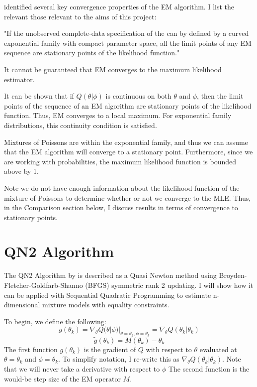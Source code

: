 \documentclass[letter,12pt]{article}
\begin{document}
\cite{wu1983} identified several key convergence properties of the EM algorithm.  I list the relevant those relevant to the aims of this project:
\begin{list}{-}{}
\item "If the unobserved complete-data specification of the can by defined by a curved exponential family with compact parameter space, all the limit points of any EM sequence are stationary points of the likelihood function."
\item It cannot be guaranteed that EM converges to the maximum likelihood estimator.
\item It can be shown that if $Q(\theta|\phi)$ is continuous on both $\theta$ and $\phi$, then the limit points of the sequence of an EM algorithm are stationary points of the likelihood function.  Thus, EM converges to a local maximum.  For exponential family distributions, this continuity condition is satisfied.
\end{list}

Mixtures of Poissons are within the exponential family, and thus we can assume that the EM algorithm will converge to a stationary point.  Furthermore, since we are working with probabilities, the maximum likelihood function is bounded above by 1. 

Note we do not have enough information about the likelihood function of the mixture of Poissons to determine whether or not we converge to the MLE.  Thus, in the Comparison section below, I discuss results in terms of convergence to stationary points.

\section{QN2 Algorithm}

The QN2 Algorithm by \cite{jamshidianj97} is described as a Quasi Newton method using Broyden-Fletcher-Goldfarb-Shanno (BFGS) symmetric rank 2 updating.  I will show how it can be applied with Sequential Quadratic Programming to estimate n-dimensional mixture models with equality constraints.   

To begin, we define the following:
\begin{equation} \label{eq:define_g}
g(\theta_k) = \nabla_{\theta}Q(\theta|\phi)|_{\theta =\theta_k, \phi = \theta_k}
= \nabla_{\theta}Q(\theta_k|\theta_k)
\end{equation}
\begin{equation} \label{eq:define_gsquiggly}
\tilde{g}(\theta_k) = M(\theta_k) - \theta_k
\end{equation}
The first function $g(\theta_k)$ is the gradient of $Q$ with respect to $\theta$ evaluated at $\theta = \theta_k$ and $\phi=\theta_k$.  To simplify notation, I re-write this as $\nabla_{\theta}Q(\theta_k|\theta_k)$.  Note that we will never take a derivative with respect to $\phi$ The second function is the would-be step size of the EM operator $M$.   
\end{document}
